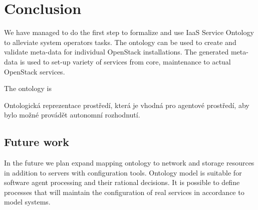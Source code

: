 
\section{Conclusion}

We have managed to do the first step to formalize and use IaaS Service Ontology to alleviate system operators tasks. The ontology can be used to create and validate meta-data for individual OpenStack installations. The generated meta-data is used to set-up variety of services from core, maintenance to actual OpenStack services. 

The ontology is  

Ontologická reprezentace prostředí, která je vhodná pro agentové prostředí, aby bylo možné provádět autonomní rozhodnutí. 

\subsection{Future work}

In the future we plan expand mapping ontology to network and storage resources in addition to servers with configuration tools. Ontology model is suitable for software agent processing and their rational decisions. It is possible to define processes that will maintain the configuration of real services in accordance to model systems.
